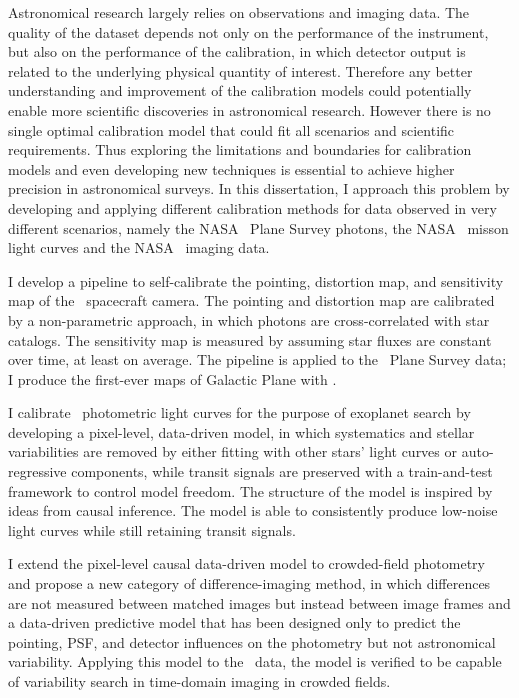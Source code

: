 Astronomical research largely relies on observations and imaging data.
The quality of the dataset depends not only on the performance of the instrument, but also on the performance of the calibration, in which detector output is related to the underlying physical quantity of interest.
Therefore any better understanding and improvement of the calibration models could potentially enable more scientific discoveries in astronomical research.
However there is no single optimal calibration model that could fit all scenarios and scientific requirements.
Thus exploring the limitations and boundaries for calibration models and even developing new techniques is essential to achieve higher precision in astronomical surveys.
In this dissertation, I approach this problem by developing and applying different calibration methods for data observed in very different scenarios, namely the NASA \galex\ Plane Survey photons, the NASA \kepler\ misson light curves and the NASA \KTCN\ imaging data.

I develop a pipeline to self-calibrate the pointing, distortion map, and sensitivity map of the \galex\ spacecraft camera.
The pointing and distortion map are calibrated by a non-parametric approach, in which photons are cross-correlated with star catalogs. 
The sensitivity map is measured by assuming star fluxes are constant over time, at least on average.
The pipeline is applied to the \galex\ Plane Survey data; I produce the first-ever maps of Galactic Plane with \galex.

I calibrate \kepler\ photometric light curves for the purpose of exoplanet search by developing a pixel-level, data-driven model, in which systematics and stellar variabilities are removed by either fitting with other stars' light curves or auto-regressive components, while transit signals are preserved with a train-and-test framework to control model freedom.
The structure of the model is inspired by ideas from causal inference.
The model is able to consistently produce low-noise light curves while still retaining transit signals.

I extend the pixel-level causal data-driven model to crowded-field photometry and propose a new category of difference-imaging method, in which differences are not measured between matched images but instead between image frames and a data-driven predictive model that has been designed only to predict the pointing, PSF, and detector influences on the photometry but not astronomical variability.
Applying this model to the \KTCN\ data, the model is verified to be capable of variability search in time-domain imaging in crowded fields.
